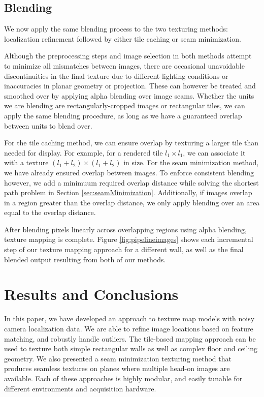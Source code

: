 \documentclass[10pt,twocolumn,letterpaper]{article}
\begin{document}
\subsection{Blending}
\label{sec:blending}
We now apply the same blending process to the two texturing methods:
localization refinement followed by either tile caching or seam
minimization.

Although the preprocessing steps and image selection in both methods
attempt to minimize all mismatches between images, there are occasional
unavoidable discontinuities in the final texture due to different
lighting conditions or inaccuracies in planar geometry or
projection. These can however be treated and smoothed over by applying
alpha blending over image seams.  Whether the units we are blending
are rectangularly-cropped images or rectangular tiles, we can apply
the same blending procedure, as long as we have a guaranteed overlap
between units to blend over.

For the tile caching method, we can ensure overlap by texturing a
larger tile than needed for display. For example, for a rendered tile
$l_1 \times l_1$, we can associate it with a texture $(l_1 + l_2)
\times (l_1 + l_2)$ in size. For the seam minimization method, we have
already ensured overlap between images. To enforce consistent blending
however, we add a minimuum required overlap distance while solving the
shortest path problem in Section
\ref{sec:seamMinimization}. Additionally, if images overlap in a region
greater than the overlap distance, we only apply blending over an area
equal to the overlap distance.

After blending pixels linearly across overlapping regions using alpha
blending, texture mapping is complete. Figure
\ref{fig:pipelineimages} shows each incremental step of our texture
mapping approach for a different wall, as well as the final blended output resulting from
both of our methods.



\section{Results and Conclusions}
\label{sec:resultsAndConclusions}
In this paper, we have developed an approach to texture map models
with noisy camera localization data. We are able to refine image
locations based on feature matching, and robustly handle outliers. The tile-based mapping approach can be used to texture both simple rectangular walls as
well as complex floor and ceiling geometry. We also presented a seam minimization texturing method that produces seamless textures on planes where
multiple head-on images are available. Each of these approaches is
highly modular, and easily tunable for different environments and
acquisition hardware.
\end{document}
